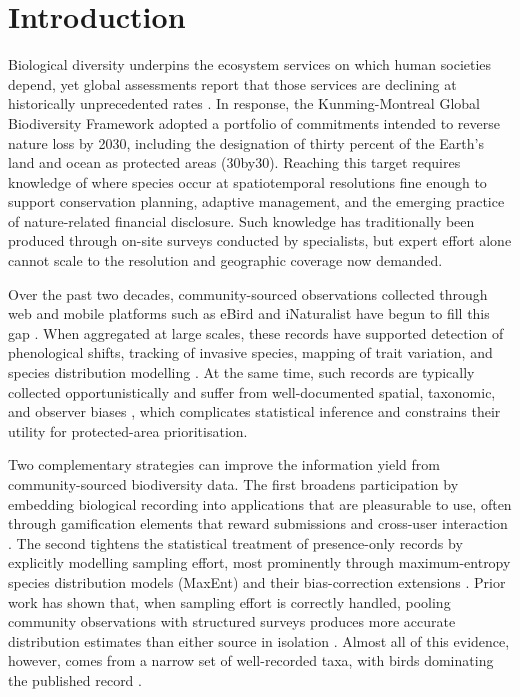 \section{Introduction}

Biological diversity underpins the ecosystem services on which human societies depend, yet global assessments report that those services are declining at historically unprecedented rates \citep{ipbes2019global,newbold2015land}. In response, the Kunming-Montreal Global Biodiversity Framework adopted a portfolio of commitments intended to reverse nature loss by 2030, including the designation of thirty percent of the Earth's land and ocean as protected areas (30by30). Reaching this target requires knowledge of where species occur at spatiotemporal resolutions fine enough to support conservation planning, adaptive management, and the emerging practice of nature-related financial disclosure. Such knowledge has traditionally been produced through on-site surveys conducted by specialists, but expert effort alone cannot scale to the resolution and geographic coverage now demanded.

Over the past two decades, community-sourced observations collected through web and mobile platforms such as eBird and iNaturalist have begun to fill this gap \citep{sullivan2009ebird,bonney2009citizen,chandler2017contribution}. When aggregated at large scales, these records have supported detection of phenological shifts, tracking of invasive species, mapping of trait variation, and species distribution modelling \citep{chandler2017contribution,pocock2015brc}. At the same time, such records are typically collected opportunistically and suffer from well-documented spatial, taxonomic, and observer biases \citep{isaac2014statistics,feldman2021trends,kendal2020citybias}, which complicates statistical inference and constrains their utility for protected-area prioritisation.

Two complementary strategies can improve the information yield from community-sourced biodiversity data. The first broadens participation by embedding biological recording into applications that are pleasurable to use, often through gamification elements that reward submissions and cross-user interaction \citep{bonney2009citizen}. The second tightens the statistical treatment of presence-only records by explicitly modelling sampling effort, most prominently through maximum-entropy species distribution models (MaxEnt) and their bias-correction extensions \citep{phillips2006maxent,phillips2008maxentextensions,phillips2009samplebias,elith2011statistical}. Prior work has shown that, when sampling effort is correctly handled, pooling community observations with structured surveys produces more accurate distribution estimates than either source in isolation \citep{johnston2018estimates,johnston2021analytical,robinson2020integrating,steen2019stringent,milanesi2020observer}. Almost all of this evidence, however, comes from a narrow set of well-recorded taxa, with birds dominating the published record \citep{feldman2021trends}.

